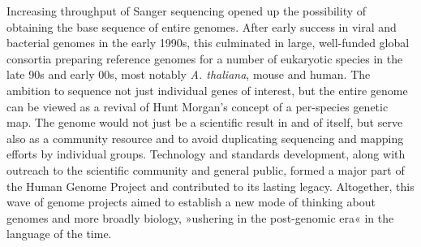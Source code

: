 Increasing throughput of Sanger sequencing opened up the possibility of obtaining the base sequence of entire genomes.
After early success in viral and bacterial genomes in the early 1990s, this culminated in large, well-funded global consortia preparing reference genomes for a number of eukaryotic species in the late 90s and early 00s, most notably \textit{A. thaliana}, mouse and human\cite{athal00, chinwalla02, lander01, venter01}.
The ambition to sequence not just individual genes of interest, but the entire genome can be viewed as a revival of Hunt Morgan's concept of a per-species genetic map.
The genome would not just be a scientific result in and of itself, but serve also as a community resource and to avoid duplicating sequencing and mapping efforts by individual groups.
Technology and standards development, along with outreach to the scientific community and general public, formed a major part of the Human Genome Project and contributed to its lasting legacy.
Altogether, this wave of genome projects aimed to establish a new mode of thinking about genomes and more broadly biology, »ushering in the post-genomic era« in the language of the time\cite{perbal15, collins03}.

